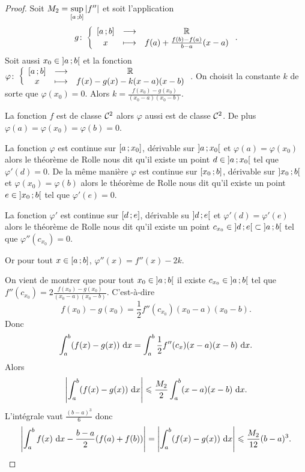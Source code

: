 \begin{proof}
  Soit \(M_2 = \sup\limits_{\left[ a \, ; {} b \right]}\left\lvert f''\right\rvert\) et soit l'application
  \begin{equation}
    g\colon\left\{\begin{array}{ccc}\left[ a \, ; {} b \right] & \longrightarrow &\mathbb{R}\\x & \longmapsto & f(a) + \frac{f(b)-f(a)}{b-a}(x-a)\end{array}\right..
  \end{equation}
  Soit aussi \(x_0 \in \left] a \, ; {} b \right[\) et la
  fonction\(\varphi\colon\left\{\begin{array}{ccc}\left[ a \, ; {} b \right] & \longrightarrow &\mathbb{R}\\x & \longmapsto & f(x)-g(x)-k(x-a)(x-b)\end{array}\right.\).
  On choisit la constante \(k\) de sorte que \(\varphi(x_0) = 0\).
  Alors \(k = \frac{f(x_0)-g(x_0)}{(x_0-a)(x_0-b)}\).

  La fonction \(f\) est de classe \(\mathcal{C}^{2}\) alors \(\varphi\) aussi est de
  classe \(\mathcal{C}^{2}\). De plus \(\varphi(a) = \varphi(x_0) = \varphi(b) = 0\).

  La fonction \(\varphi\) est continue sur \(\left[ a \, ; {} x_0 \right]\), dérivable
  sur \(\left] a \, ; {} x_0 \right[\) et \(\varphi(a) = \varphi(x_0)\) alors le théorème
  de Rolle nous dit qu'il existe un point \(d \in \left] a \, ; {} x_0 \right[\) tel
  que \(\varphi'(d) = 0\). De la même manière  \(\varphi\) est continue sur
  \(\left[ x_0 \, ; {} b \right]\), dérivable sur \(\left] x_0 \, ; {} b \right[\) et
  \(\varphi(x_0) = \varphi(b)\) alors le théorème de Rolle nous dit qu'il existe
  un point \(e \in \left] x_0 \, ; {} b \right[\) tel que \(\varphi'(e) = 0\).

  La fonction \(\varphi'\) est continue sur \(\left[ d \, ; {} e \right]\), dérivable
  su \(\left] d \, ; {} e \right[\) et \(\varphi'(d) = \varphi'(e)\) alors le théorème de
  Rolle nous dit qu'il existe un point \(c_{x_0} \in \left] d \, ; {} e \right[
  \subset \left] a \, ; {} b \right[\) tel que \(\varphi''(c_{x_0}) = 0\).

  Or pour tout \(x \in \left[ a \, ; {} b \right]\), \(\varphi''(x) = f''(x)-2k\).

  On vient de montrer que pour tout \(x_0 \in \left] a \, ; {} b \right[\) il existe
  \(c_{x_0} \in\left] a \, ; {} b \right[\) tel que
  \(f''(c_{x_0}) = 2\frac{f(x_0)-g(x_0)}{(x_0-a)(x_0-b)}\). C'est-à-dire
  \begin{equation}
    f(x_0)-g(x_0) = \frac{1}{2} f''(c_{x_0})(x_0-a)(x_0-b).
  \end{equation}
  Donc
  \begin{equation}
    \int_a^b (f(x)-g(x))\,\mathop{}\mathopen{}\mathrm{d} x = \int_a^b \frac{1}{2}
    f''(c_{x})(x-a)(x-b)\,\mathop{}\mathopen{}\mathrm{d} x.
  \end{equation}
  Alors
  \begin{equation}
    \left\lvert\int_a^b (f(x)-g(x))\,\mathop{}\mathopen{}\mathrm{d} x\right\rvert \leqslant \frac{M_2}{2} \int_a^b
    (x-a)(x-b)\,\mathop{}\mathopen{}\mathrm{d} x.
  \end{equation}
  L'intégrale vaut \(\frac{(b-a)^3}{6}\) donc
  \begin{equation}
    \left\lvert\int_a^b f(x)\,\mathop{}\mathopen{}\mathrm{d} x -\frac{b-a}{2}(f(a)+f(b))\right\rvert = \left\lvert\int_a^b
    (f(x)-g(x))\,\mathop{}\mathopen{}\mathrm{d} x\right\rvert \leqslant \frac{M_2}{12} (b-a)^3.
  \end{equation}
\end{proof}


